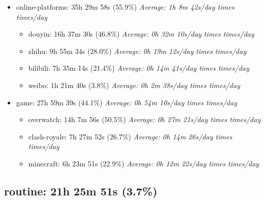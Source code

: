 \documentclass[12pt]{extarticle}
\begin{document}
\begin{itemize}[topsep=0pt, itemsep=-0.5ex]
    \item online-platforms: 35h 29m 58s (55.9\%)
        \textit{Average: 1h 8m 42s/day  times  times/day}\par
\begin{itemize}[topsep=0pt, itemsep=-0.5ex]
    \item douyin: 16h 37m 30s (46.8\%)
        \textit{Average: 0h 32m 10s/day  times  times/day}\par
    \item zhihu: 9h 55m 34s (28.0\%)
        \textit{Average: 0h 19m 12s/day  times  times/day}\par
    \item bilibili: 7h 35m 14s (21.4\%)
        \textit{Average: 0h 14m 41s/day  times  times/day}\par
    \item weibo: 1h 21m 40s (3.8\%)
        \textit{Average: 0h 2m 38s/day  times  times/day}\par
\end{itemize}
    \item game: 27h 59m 39s (44.1\%)
        \textit{Average: 0h 54m 10s/day  times  times/day}\par
\begin{itemize}[topsep=0pt, itemsep=-0.5ex]
    \item overwatch: 14h 7m 56s (50.5\%)
        \textit{Average: 0h 27m 21s/day  times  times/day}\par
    \item clash-royale: 7h 27m 52s (26.7\%)
        \textit{Average: 0h 14m 26s/day  times  times/day}\par
    \item minecraft: 6h 23m 51s (22.9\%)
        \textit{Average: 0h 12m 22s/day  times  times/day}\par
\end{itemize}
\end{itemize}
{\fontsize{16}{19.2}\selectfont\subsection*{routine: 21h 25m 51s (3.7\%)}}
\end{document}
